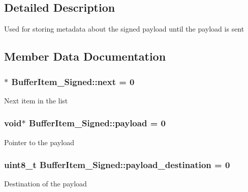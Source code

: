 \subsection{Detailed Description}
Used for storing metadata about the signed payload until the payload is sent 

\subsection{Member Data Documentation}
\subsubsection[{\texorpdfstring{next}{next}}]{$\ast$ Buffer\+Item\+\_\+\+Signed\+::next = 0}\hypertarget{structBufferItem__Signed_a86ea87809ef5786a04f1218ac028fa13}{}\label{structBufferItem__Signed_a86ea87809ef5786a04f1218ac028fa13}
Next item in the list 
\subsubsection[{\texorpdfstring{payload}{payload}}]{\setlength{\rightskip}{0pt plus 5cm}void$\ast$ Buffer\+Item\+\_\+\+Signed\+::payload = 0}\hypertarget{structBufferItem__Signed_a4f268b032fb161b2c73daad2d2659291}{}\label{structBufferItem__Signed_a4f268b032fb161b2c73daad2d2659291}
Pointer to the payload 
\subsubsection[{\texorpdfstring{payload\+\_\+destination}{payload_destination}}]{\setlength{\rightskip}{0pt plus 5cm}uint8\+\_\+t Buffer\+Item\+\_\+\+Signed\+::payload\+\_\+destination = 0}\hypertarget{structBufferItem__Signed_ad71dae240fb681bedb0c0332fff403fe}{}\label{structBufferItem__Signed_ad71dae240fb681bedb0c0332fff403fe}
Destination of the payload 
